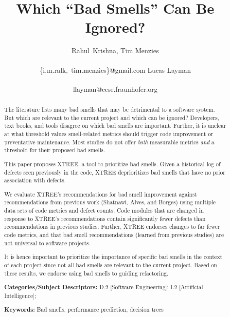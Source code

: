 \documentclass{sig-alternate}
\theoremstyle{break}
\begin{document}
  


\title{  Which ``Bad Smells'' Can Be Ignored?}
\author{  
\alignauthor
Rahul~Krishna, Tim Menzies  \\
       \\
       {\{i.m.ralk,~tim.menzies\}@gmail.com}
\alignauthor
Lucas Layman \\
       \\ 
       {llayman@cese.fraunhofer.org}
\setlength{\columnsep}{7mm}}
\maketitle
\begin{abstract} 
The literature lists many   bad smells that may
be detrimental to a software system.
But which are relevant to the current project
and which can be ignored?
Developers, text books, and tools
disagree on which bad smells are important. 
Further, it is unclear at what threshold values smell-related metrics
should trigger code improvement or preventative maintenance. Most studies do not offer
{\em both} measurable metrics {\em and} a threshold for their proposed bad smells.
 
This paper proposes XTREE, a tool to prioritize  bad  smells.
Given a historical log of defects seen previously in the code, XTREE deprioritizes bad smells that have   no prior  association with defects. 

We evaluate XTREE's recommendations for bad smell improvement against recommendations from previous work (Shatnawi, Alves, and Borges) using multiple data sets of code metrics and defect counts.  Code modules that are changed in response to XTREE's recommendations contain significantly fewer defects than recommendations in previous studies. 
  Further, XTREE endorses
  changes to far fewer code metrics, and that bad smell recommendations (learned from previous studies) are not universal to software projects.
 
   
  
It is hence important to  prioritize the importance of specific bad smells in the context of each project since not all bad smells are relevant to the current project. Based on these results, we endorse using bad smells to guiding refactoring. 

 
{\bf Categories/Subject Descriptors:} D.2 [Software Engineering]; I.2 [Artificial Intelligence];

 
{\bf Keywords:} Bad smells,
performance prediction,  decision trees 
\end{abstract}
\end{document}
